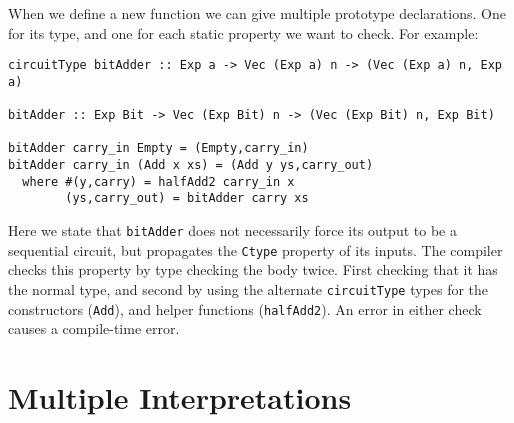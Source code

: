 \documentclass[10pt,twoside]{article}
\begin{document}
When we define a new function we can give multiple prototype declarations.
One for its type, and one for each static property we want to check. For example:

\begin{verbatim}
circuitType bitAdder :: Exp a -> Vec (Exp a) n -> (Vec (Exp a) n, Exp a)

bitAdder :: Exp Bit -> Vec (Exp Bit) n -> (Vec (Exp Bit) n, Exp Bit)

bitAdder carry_in Empty = (Empty,carry_in) 
bitAdder carry_in (Add x xs) = (Add y ys,carry_out)
  where #(y,carry) = halfAdd2 carry_in x
        (ys,carry_out) = bitAdder carry xs
\end{verbatim}
Here we state that {\tt bitAdder} does not necessarily force
its output to be a sequential circuit, but propagates the {\tt Ctype}
property of its inputs. The compiler checks this property by
type checking the body twice. First checking that it has the normal
type, and second by using the alternate {\tt circuitType} types for
the constructors ({\tt Add}), and helper functions ({\tt halfAdd2}). An error
in either check causes a compile-time error.


\section{Multiple Interpretations}\label{multinterp}
\end{document}
